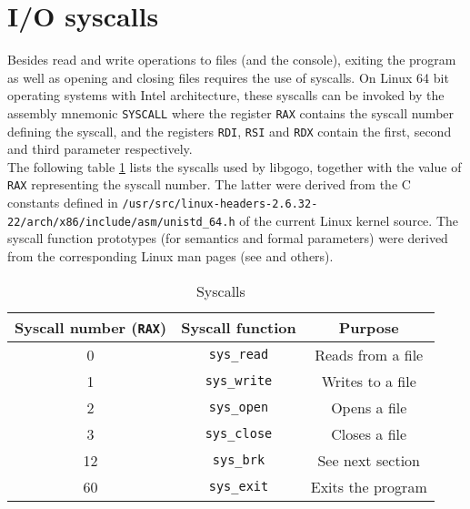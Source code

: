 \documentclass[a4paper]{scrreprt}
\begin{document}
    \section{I/O syscalls}
      Besides read and write operations to files (and the console), exiting the program as well as opening and closing files requires the use of syscalls. On Linux 64 bit operating systems with Intel architecture, these syscalls can be invoked by the assembly mnemonic \texttt{SYSCALL} where the register \texttt{RAX} contains the syscall number defining the syscall, and the registers \texttt{RDI}, \texttt{RSI} and \texttt{RDX} contain the first, second and third parameter respectively\cite{var08}.\\
      The following table \ref{tbl:syscalls} lists the syscalls used by libgogo, together with the value of \texttt{RAX} representing the syscall number. The latter were derived from the C constants defined in \texttt{/usr/src/linux-headers-2.6.32-22/arch/x86/include/asm/unistd\_64.h} of the current Linux kernel source\cite{var10}. The syscall function prototypes (for semantics and formal parameters) were derived from the corresponding Linux man pages (see \cite{var97} and others).

      \begin{table}[htb]
      \centering
      \begin{tabular}{ccc}
        \toprule
        \textbf{Syscall number (\texttt{RAX})} & \textbf{Syscall function} & \textbf{Purpose}\\
        \midrule
        0 & \texttt{sys\_read} & Reads from a file\\
        1 & \texttt{sys\_write} & Writes to a file\\
        2 & \texttt{sys\_open} & Opens a file\\
        3 & \texttt{sys\_close} & Closes a file\\
        12 & \texttt{sys\_brk} & See next section\\
        60 & \texttt{sys\_exit} & Exits the program\\
        \bottomrule
      \end{tabular}
      \caption{Syscalls}
      \label{tbl:syscalls}
      \end{table}
\end{document}
